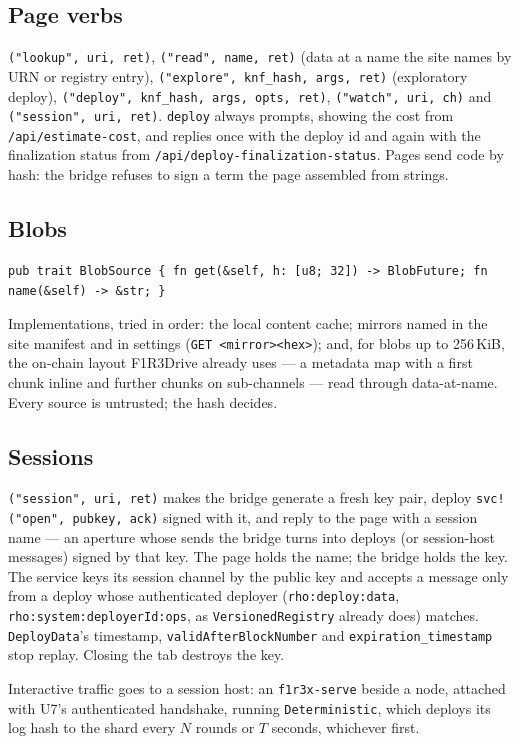 \documentclass[11pt]{article}
\theoremstyle{definition}
\theoremstyle{remark}
\newcommand{\code}[1]{\texttt{#1}}
\begin{document}
\subsection{Page verbs}
\code{("lookup", uri, ret)}, \code{("read", name, ret)} (data at a name the site
names by URN or registry entry), \code{("explore", knf\_hash, args, ret)} (exploratory
deploy), \code{("deploy", knf\_hash, args, opts, ret)}, \code{("watch", uri, ch)} and
\code{("session", uri, ret)}. \code{deploy} always prompts, showing the cost from
\code{/api/estimate-cost}, and replies once with the deploy id and again with the
finalization status from \code{/api/deploy-finalization-status}. Pages send code by
hash: the bridge refuses to sign a term the page assembled from strings.

\subsection{Blobs}\label{sec:blobs}
\begin{lstlisting}[language=RustLite]
pub trait BlobSource { fn get(&self, h: [u8; 32]) -> BlobFuture; fn name(&self) -> &str; }
\end{lstlisting}
Implementations, tried in order: the local content cache; mirrors named in the site
manifest and in settings (\code{GET <mirror><hex>}); and, for blobs up to 256\,KiB,
the on-chain layout F1R3Drive already uses --- a metadata map with a first chunk
inline and further chunks on sub-channels --- read through data-at-name. Every source
is untrusted; the hash decides.

\subsection{Sessions}\label{sec:sessions}
\code{("session", uri, ret)} makes the bridge generate a fresh key pair, deploy
\code{svc!("open", pubkey, ack)} signed with it, and reply to the page with a
session name --- an aperture whose sends the bridge turns into deploys (or session-host
messages) signed by that key. The page holds the name; the bridge holds the key.
The service keys its session channel by the public key and accepts a message only
from a deploy whose authenticated deployer (\code{rho:deploy:data},
\code{rho:system:deployerId:ops}, as \code{VersionedRegistry} already does) matches.
\code{DeployData}'s timestamp, \code{validAfterBlockNumber} and
\code{expiration\_timestamp} stop replay. Closing the tab destroys the key.

Interactive traffic goes to a session host: an \code{f1r3x-serve} beside a node,
attached with U7's authenticated handshake, running \code{Deterministic}, which
deploys its log hash to the shard every $N$ rounds or $T$ seconds, whichever first.
\end{document}
